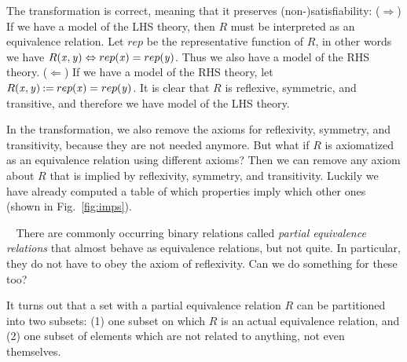 \documentclass{article}
\newcommand{\Varid}[1]{\mathit{#1}}
\renewcommand{\paragraph}[1]{\vspace{0.2cm}\noindent {\bf #1} $\;\;$}
\begin{document}
The transformation is correct, meaning that it preserves (non-)satisfiability: ($\Rightarrow$) If we have a model of the LHS theory, then \ensuremath{R} must be interpreted as an equivalence relation. Let \ensuremath{rep} be the representative function of \ensuremath{R}, in other words we have \ensuremath{R\hspace{-0.1cm}\;(\Varid{x},\Varid{y})\Leftrightarrow rep\hspace{-0.1cm}\;(\Varid{x})\mathrel{=}rep\hspace{-0.1cm}\;(\Varid{y})}. Thus we also have a model of the RHS theory. ($\Leftarrow$) If we have a model of the RHS theory, let \ensuremath{R\hspace{-0.1cm}\;(\Varid{x},\Varid{y})\mathbin{:=}rep\hspace{-0.1cm}\;(\Varid{x})\mathrel{=}rep\hspace{-0.1cm}\;(\Varid{y})}. It is clear that \ensuremath{R} is reflexive, symmetric, and transitive, and therefore we have model of the LHS theory.

In the transformation, we also remove the axioms for reflexivity, symmetry, and transitivity, because they are not needed anymore. But what if \ensuremath{R} is axiomatized as an equivalence relation using different axioms? Then we can remove any axiom about \ensuremath{R} that is implied by reflexivity, symmetry, and transitivity. Luckily we have already computed a table of which properties imply which other ones (shown in Fig.\ \ref{fig:imps}).

\paragraph{Pequalification} There are commonly occurring binary relations called {\em partial equivalence relations} that almost behave as equivalence relations, but not quite. In particular, they do not have to obey the axiom of reflexivity. Can we do something for these too?

It turns out that a set with a partial equivalence relation \ensuremath{R} can be partitioned into two subsets: (1) one subset on which \ensuremath{R} is an actual equivalence relation, and (2) one subset of elements which are not related to anything, not even themselves.
\end{document}
